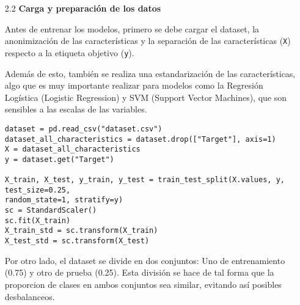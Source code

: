 \documentclass{article}
\begin{document}
\bigskip

\begin{itemize}

\item[2.2]  {\bf Carga y preparaci\'on de los datos}

Antes de entrenar los modelos, primero se debe cargar el dataset, la anonimizaci\'on de las caracter\'isticas y la separaci\'on de las caracter\'isticas (\texttt{X}) respecto a la etiqueta objetivo (\texttt{y}). 

Adem\'as de esto, tambi\'en se realiza una estandarizaci\'on de las caracter\'isticas, algo que es muy importante realizar para modelos como la Regresi\'on Log\'istica (Logistic Regression) y SVM (Support Vector Machines), que son sensibles a las escalas de las variables.

\begin{tcolorbox}[width=14cm]
\begin{scriptsize}
\begin{verbatim}
dataset = pd.read_csv("dataset.csv")
dataset_all_characteristics = dataset.drop(["Target"], axis=1)
X = dataset_all_characteristics
y = dataset.get("Target")

X_train, X_test, y_train, y_test = train_test_split(X.values, y, test_size=0.25, 
random_state=1, stratify=y)
sc = StandardScaler()
sc.fit(X_train)
X_train_std = sc.transform(X_train)
X_test_std = sc.transform(X_test)
\end{verbatim}
\end{scriptsize}
\end{tcolorbox}

Por otro lado, el dataset se divide en dos conjuntos: Uno de entrenamiento (0.75) y otro de prueba (0.25). Esta divisi\'on se hace de tal forma que la proporcion de clases en ambos conjuntos sea similar, evitando as\'i posibles desbalanceos.

\end{itemize}

\bigskip
\end{document}
